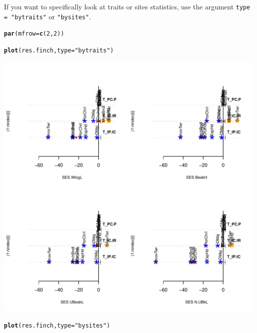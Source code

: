 \documentclass[12pt]{article}\usepackage[]{graphicx}\usepackage[]{color}
\makeatletter
\def\maxwidth{ %
  \ifdim\Gin@nat@width>\linewidth
    \linewidth
  \else
    \Gin@nat@width
  \fi
}
\newcommand{\hlnum}[1]{\textcolor[rgb]{0.686,0.059,0.569}{#1}}%
\newcommand{\hlstr}[1]{\textcolor[rgb]{0.192,0.494,0.8}{#1}}%
\newcommand{\hlstd}[1]{\textcolor[rgb]{0.345,0.345,0.345}{#1}}%
\newcommand{\hlkwc}[1]{\textcolor[rgb]{0.333,0.667,0.333}{#1}}%
\newcommand{\hlkwd}[1]{\textcolor[rgb]{0.737,0.353,0.396}{\textbf{#1}}}%
\newenvironment{kframe}{%
 \def\at@end@of@kframe{}%
 \ifinner\ifhmode%
  \def\at@end@of@kframe{\end{minipage}}%
  \begin{minipage}{\columnwidth}%
 \fi\fi%
 \def\FrameCommand##1{\hskip\@totalleftmargin \hskip-\fboxsep
 \colorbox{shadecolor}{##1}\hskip-\fboxsep
     \hskip-\linewidth \hskip-\@totalleftmargin \hskip\columnwidth}%
 \MakeFramed {\advance\hsize-\width
   \@totalleftmargin\z@ \linewidth\hsize
   \@setminipage}}%
 {\par\unskip\endMakeFramed%
 \at@end@of@kframe}
\newenvironment{knitrout}{}{} %
\makeatother
\begin{document}
If you want to specifically look at traits or sites statistics, use the argument \texttt{type = "bytraits"} or \texttt{"bysites"}.
\begin{knitrout}
\color{fgcolor}\begin{kframe}
\begin{alltt}
\hlkwd{par}\hlstd{(}\hlkwc{mfrow}\hlstd{=}\hlkwd{c}\hlstd{(}\hlnum{2}\hlstd{,}\hlnum{2}\hlstd{))}

\hlkwd{plot}\hlstd{(res.finch,} \hlkwc{type} \hlstd{=} \hlstr{"bytraits"}\hlstd{)}
\end{alltt}
\end{kframe}

{\centering \includegraphics[width=\maxwidth]{figure/unnamed-chunk-36-1} 

}


\begin{kframe}\begin{alltt}
\hlkwd{plot}\hlstd{(res.finch,} \hlkwc{type} \hlstd{=} \hlstr{"bysites"}\hlstd{)}
\end{alltt}
\end{kframe}


\end{knitrout}
\end{document}
